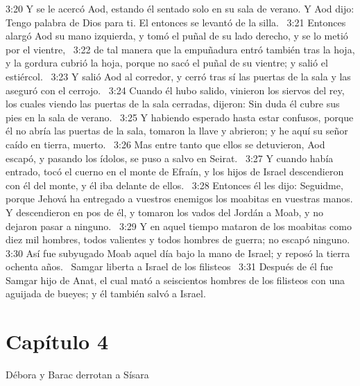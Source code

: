 3:20 Y se le acercó Aod, estando él sentado solo en su sala de verano. Y Aod dijo: Tengo palabra de Dios para ti. El entonces se levantó de la silla.  
3:21 Entonces alargó Aod su mano izquierda, y tomó el puñal de su lado derecho, y se lo metió por el vientre,  
3:22 de tal manera que la empuñadura entró también tras la hoja, y la gordura cubrió la hoja, porque no sacó el puñal de su vientre; y salió el estiércol.  
3:23 Y salió Aod al corredor, y cerró tras sí las puertas de la sala y las aseguró con el cerrojo.  
3:24 Cuando él hubo salido, vinieron los siervos del rey, los cuales viendo las puertas de la sala cerradas, dijeron: Sin duda él cubre sus pies en la sala de verano.  
3:25 Y habiendo esperado hasta estar confusos, porque él no abría las puertas de la sala, tomaron la llave y abrieron; y he aquí su señor caído en tierra, muerto.  
3:26 Mas entre tanto que ellos se detuvieron, Aod escapó, y pasando los ídolos, se puso a salvo en Seirat.  
3:27 Y cuando había entrado, tocó el cuerno en el monte de Efraín, y los hijos de Israel descendieron con él del monte, y él iba delante de ellos.  
3:28 Entonces él les dijo: Seguidme, porque Jehová ha entregado a vuestros enemigos los moabitas en vuestras manos. Y descendieron en pos de él, y tomaron los vados del Jordán a Moab, y no dejaron pasar a ninguno.  
3:29 Y en aquel tiempo mataron de los moabitas como diez mil hombres, todos valientes y todos hombres de guerra; no escapó ninguno.  
3:30 Así fue subyugado Moab aquel día bajo la mano de Israel; y reposó la tierra ochenta años.  
Samgar liberta a Israel de los filisteos  
3:31 Después de él fue Samgar hijo de Anat, el cual mató a seiscientos hombres de los filisteos con una aguijada de bueyes; y él también salvó a Israel.  
\section*{Capítulo 4 }
Débora y Barac derrotan a Sísara  

